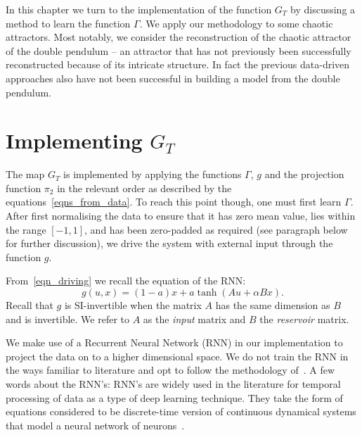 In this chapter we turn to the implementation of the function $G_T$ by discussing a method to learn the function $\Gamma$. We apply our methodology to some chaotic attractors. 
Most notably, we consider the reconstruction of the chaotic attractor of the double pendulum -- an  attractor that has not previously been successfully reconstructed because of its intricate structure. In fact the previous data-driven approaches also have not been successful in building a model from the double pendulum. 


\section{Implementing $G_T$}
The map $G_T$ is implemented by applying the functions $\Gamma$, $g$ and the projection function $\pi_2$ in the relevant order as described by the equations~\ref{eqns_from_data}. To reach this point though, one must first learn $\Gamma$.
After first normalising the data to ensure that it has zero mean value, lies within the range $[-1,1]$, and has been zero-padded as required (see paragraph below for further discussion), we drive the system with external input through the function $g$.

From~\eqref{eqn_driving} we recall the equation of the RNN: \[g(u,x) = (1-a) x + a \tanh(Au + \alpha B x).\]
Recall that $g$ is SI-invertible when the matrix $A$ has the same dimension as $B$ and is invertible. We refer to $A$ as the \textit{input} matrix and $B$ the \textit{reservoir} matrix. 

We make use of a Recurrent Neural Network (RNN) in our implementation to project the data on to a higher dimensional space. We do not train the RNN in the ways familiar to literature and opt to follow the methodology of~\cite{manjunath2021universal}. 
A few words about the RNN's: RNN's are widely used in the literature for temporal processing of data as a type of deep learning technique. 
They take the form of equations considered to be discrete-time version of continuous dynamical systems that model a neural network of neurons~\cite{jaeger2001echo}.

